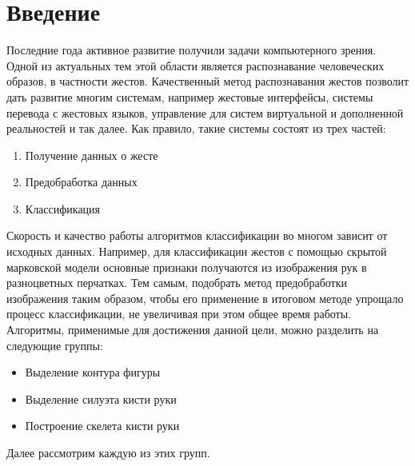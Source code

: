 \section{Введение}
\label{sec:Intro}

Последние года активное развитие получили задачи компьютерного зрения. Одной из актуальных тем этой области является распознавание человеческих образов, в частности жестов. Качественный метод распознавания жестов позволит дать развитие многим системам, например жестовые интерфейсы, системы перевода с жестовых языков, управление для систем виртуальной и дополненной реальностей и так далее. 
Как правило, такие системы состоят из трех частей:

\begin{enumerate}
	\item Получение данных о жесте
	\item Предобработка данных
	\item Классификация
\end{enumerate}

Скорость и качество работы алгоритмов классификации во многом зависит от исходных данных. Например, для классификации жестов с помощью скрытой марковской модели \cite{inproceedings} основные признаки получаются из изображения рук в разноцветных перчатках. Тем самым, подобрать метод предобработки изображения таким образом, чтобы его применение в итоговом методе упрощало процесс классификации, не увеличивая при этом общее время работы. Алгоритмы, применимые для достижения данной цели, можно разделить на следующие группы:
\begin{itemize}
	\item Выделение контура фигуры
	\item Выделение силуэта кисти руки
	\item Построение скелета кисти руки
\end{itemize}

Далее рассмотрим каждую из этих групп.